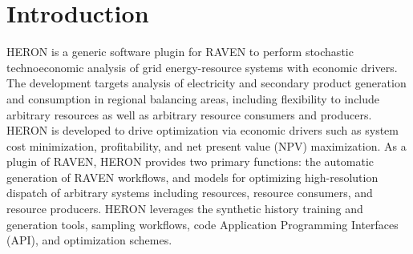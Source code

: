 \section{Introduction}
HERON is a generic software plugin for RAVEN to perform stochastic technoeconomic analysis of grid
energy-resource systems with economic drivers. The development targets analysis of electricity and
secondary product generation and consumption in regional balancing areas, including flexibility to
include arbitrary resources as well as arbitrary resource consumers and producers. HERON is
developed to drive optimization via economic drivers such as system cost minimization,
profitability, and net present value (NPV) maximization. As a plugin of RAVEN, HERON provides two
primary functions: the automatic generation of RAVEN workflows, and models for optimizing
high-resolution dispatch of arbitrary systems including resources, resource consumers, and resource
producers. HERON leverages the synthetic history training and generation tools, sampling workflows,
code Application Programming Interfaces (API), and optimization schemes.